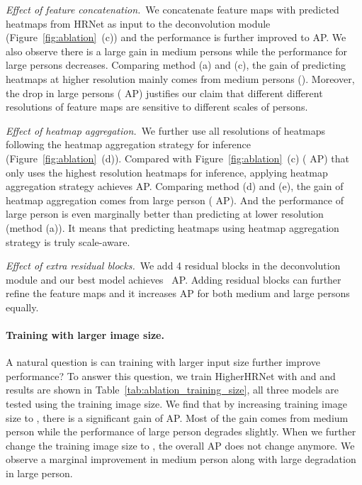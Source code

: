 \documentclass[10pt,twocolumn,letterpaper]{article}
\begin{document}
\noindent\emph{Effect of feature concatenation.}~We concatenate feature maps with predicted heatmaps from HRNet as input to the deconvolution module (Figure~\ref{fig:ablation}~(c)) and the performance is further improved to  AP. We also observe there is a large gain in medium persons while the performance for large persons decreases. Comparing method (a) and (c), the gain of predicting heatmaps at higher resolution mainly comes from medium persons (). Moreover, the drop in large persons ( AP) justifies our claim that different different resolutions of feature maps are sensitive to different scales of persons.

\noindent\emph{Effect of heatmap aggregation.}~We further use all resolutions of heatmaps following the heatmap aggregation strategy for inference (Figure~\ref{fig:ablation}~(d)).  Compared with Figure~\ref{fig:ablation}~(c) ( AP) that only uses the highest resolution heatmaps for inference, applying heatmap aggregation strategy achieves  AP. Comparing method (d) and (e), the gain of heatmap aggregation comes from large person ( AP). And the performance of large person is even marginally better than predicting at lower resolution (method (a)). It means that predicting heatmaps using heatmap aggregation strategy is truly scale-aware.

\noindent\emph{Effect of extra residual blocks.}~We add 4 residual blocks in the deconvolution module and our best model achieves ~AP. Adding residual blocks can further refine the feature maps and it increases AP for both medium and large persons equally.



\vspace{-4mm}
\paragraph{Training with larger image size.}
A natural question is can training with larger input size further improve performance? To answer this question, we train HigherHRNet with  and  and results are shown in Table~\ref{tab:ablation_training_size}, all three models are tested using the training image size. We find that by increasing training image size to , there is a significant gain of  AP. Most of the gain comes from medium person while the performance of large person degrades slightly. When we further change the training image size to , the overall AP does not change anymore. We observe a marginal improvement in medium person along with large degradation in large person. 
\end{document}
